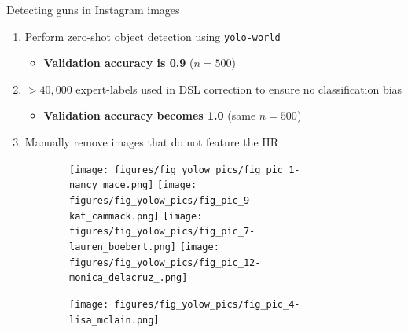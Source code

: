 \documentclass[final]{beamer}
\newlength{\colwidth}
\begin{document}
\begin{frame}[t]
\begin{columns}[t]
\begin{column}{\colwidth}
\begin{block}{Detecting guns in Instagram images}
\begin{enumerate}
\item Perform zero-shot object detection using \texttt{yolo-world} \cite{cheng2024yolow} 
\begin{itemize}
\item \textbf{Validation accuracy is 0.9} ($n = 500$)
\end{itemize}
\item $>40,000$ expert-labels used in DSL correction to ensure no classification bias \cite{NEURIPS2023_d862f7f5} %
\begin{itemize}
\item \textbf{Validation accuracy becomes 1.0} (same $n = 500$)
\end{itemize}
\item Manually remove images that do not feature the HR
\end{enumerate}
\begin{figure}[!htb]
    \centering
    \begin{subfigure}{\linewidth}
    \begin{center}
    \texttt{[image: figures/fig\_yolow\_pics/fig\_pic\_1-nancy\_mace.png]} 
    \texttt{[image: figures/fig\_yolow\_pics/fig\_pic\_9-kat\_cammack.png]}
    \texttt{[image: figures/fig\_yolow\_pics/fig\_pic\_7-lauren\_boebert.png]}
    \texttt{[image: figures/fig\_yolow\_pics/fig\_pic\_12-monica\_delacruz\_.png]}
    \end{center}
    \begin{center}
    \texttt{[image: figures/fig\_yolow\_pics/fig\_pic\_4-lisa\_mclain.png]}

\end{center}
\end{subfigure}
\end{figure}
\end{block}
\end{column}
\end{columns}
\end{frame}
\end{document}
